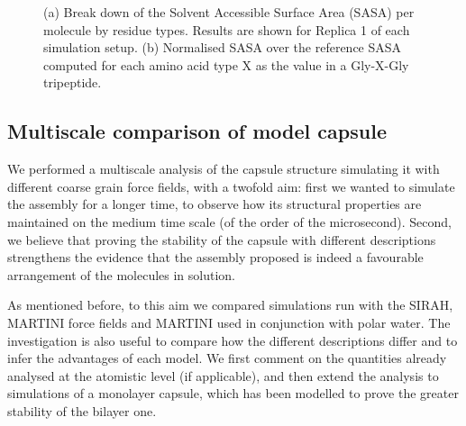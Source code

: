 \begin{figure}[t]
\centering
{} 
\caption[SASA per residue of a buckyball in solution]{(a) Break down of the Solvent Accessible Surface Area (SASA) per molecule by residue types. Results are shown for Replica 1 of each simulation setup. (b) Normalised SASA over the reference SASA computed for each amino acid type X as the value in a Gly-X-Gly tripeptide.}
\label{fig:BTI_sasa_exposed}
\end{figure}


\subsection{Multiscale comparison of model capsule} \label{sec:res_multiscale}

We performed a multiscale analysis of the capsule structure simulating it with different coarse grain force fields, with a twofold aim: first we wanted to simulate the assembly for a longer time, to observe how its structural properties are maintained on the medium time scale (of the order of the microsecond). Second, we believe that proving the stability of the capsule with different descriptions strengthens the evidence that the assembly proposed is indeed a favourable arrangement of the molecules in solution.

As mentioned before, to this aim we compared simulations run with the SIRAH, MARTINI force fields and MARTINI used in conjunction with polar water. The investigation is also useful to compare how the different descriptions differ and to infer the advantages of each model.
%
We first comment on the quantities already analysed at the atomistic level (if applicable), and then extend the analysis to simulations of a monolayer capsule, which has been modelled to prove the greater stability of the bilayer one.

